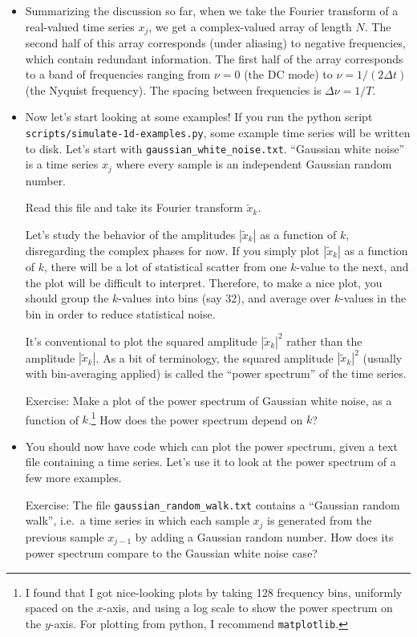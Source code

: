 \documentclass[aps,prd,superscriptaddress,groupedaddress,nofootinbib,nobibnotes]{revtex4}
\def\tx{{\tilde x}}
\begin{document}
\begin{itemize}
\item Summarizing the discussion so far, when we take the Fourier transform of a real-valued time series $x_j$,
  we get a complex-valued array of length $N$.  The second half of this array corresponds (under aliasing)
  to negative frequencies, which contain redundant information.  The first half of the array corresponds
  to a band of frequencies ranging from $\nu=0$ (the DC mode) to $\nu = 1/(2\Delta t)$ (the Nyquist frequency).
  The spacing between frequencies is $\Delta \nu = 1/T$.

\item Now let's start looking at some examples!
  If you run the python script {\tt scripts/simulate-1d-examples.py}, some example time series will be written to disk.
  Let's start with {\tt gaussian\_white\_noise.txt}.
  ``Gaussian white noise'' is a time series $x_j$ where every sample is an independent Gaussian random number.

  Read this file and take its Fourier transform $\tx_k$.

  Let's study the behavior of the amplitudes $|\tx_k|$ as a function of $k$,
  disregarding the complex phases for now.
  If you simply plot $|\tx_k|$ as a function of $k$, there will be a lot of statistical scatter
  from one $k$-value to the next, and the plot will be difficult to interpret.
  Therefore, to make a nice plot, you should group the $k$-values into bins (say 32), and average 
  over $k$-values in the bin in order to reduce statistical noise.

  It's conventional to plot the squared amplitude $|\tx_k|^2$ rather than the amplitude $|\tx_k|$.
  As a bit of terminology, the squared amplitude $|\tx_k|^2$ (usually with bin-averaging applied)
  is called the ``power spectrum'' of the time series.
 
  Exercise: Make a plot of the power spectrum of Gaussian white noise, 
  as a function of $k$.\footnote{I found that I got nice-looking plots by taking 128 frequency
    bins, uniformly spaced on the $x$-axis, and using a log scale to show the power spectrum on
    the $y$-axis.  For plotting from python, I recommend {\tt matplotlib}.}
  How does the power spectrum depend on $k$?

\item You should now have code which can plot the power spectrum, given a text file containing
 a time series.  Let's use it to look at the power spectrum of a few more examples.

 Exercise: The file {\tt gaussian\_random\_walk.txt} contains a ``Gaussian random walk'', i.e.~a time
 series in which each sample $x_j$ is generated from the previous sample $x_{j-1}$ by adding
 a Gaussian random number.  How does its power spectrum compare to the Gaussian white noise case?


\end{itemize}
\end{document}
